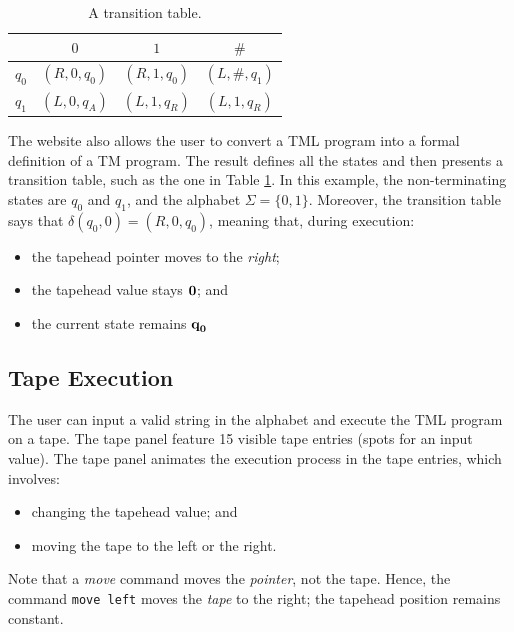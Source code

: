 \begin{table}[htb]
    \centering
    \begin{tabular}{c|ccc}
        & $0$ & $1$ & $\#$ \\
        \hline
        $q_0$ & $(R, 0, q_0)$ & $(R, 1, q_0)$ & $(L, \#, q_1)$ \\
        $q_1$ & $(L, 0, q_A)$ & $(L, 1, q_R)$ & $(L, 1, q_R)$ 
    \end{tabular}
    \caption{A transition table.}
    \label{tbl:table_isDiv2}
\end{table}

The website also allows the user to convert a TML program into a formal definition of a TM program. The result defines all the states and then presents a transition table, such as the one in Table \ref{tbl:table_isDiv2}. In this example, the non-terminating states are $q_0$ and $q_1$, and the alphabet $\Sigma = \{0, 1\}$. Moreover, the transition table says that $\delta(q_0, 0) = (R, 0, q_0)$, meaning that, during execution:
\begin{itemize}
    \item the tapehead pointer moves to the \emph{right};
    \item the tapehead value stays $\emph{0}$; and 
    \item the current state remains $\emph{q}_\emph{0}$
\end{itemize}

\subsection{Tape Execution}
The user can input a valid string in the alphabet and execute the TML program on a tape. The tape panel feature 15 visible tape entries (spots for an input value). The tape panel animates the execution process in the tape entries, which involves:
\begin{itemize}
    \item changing the tapehead value; and
    \item moving the tape to the left or the right.
\end{itemize}
Note that a \textit{move} command moves the \textit{pointer}, not the tape. Hence, the command \texttt{move left} moves the \textit{tape} to the right; the tapehead position remains constant.

